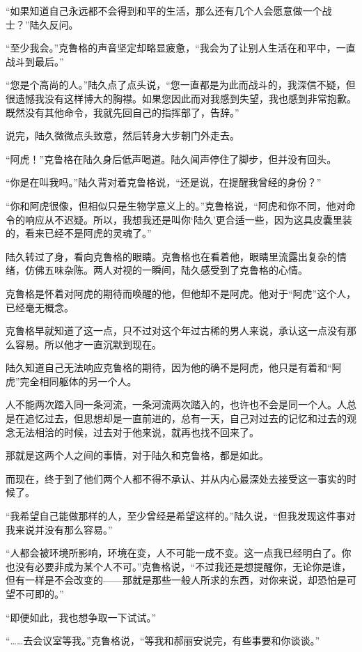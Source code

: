 “如果知道自己永远都不会得到和平的生活，那么还有几个人会愿意做一个战士？”陆久反问。

“至少我会。”克鲁格的声音坚定却略显疲惫，“我会为了让别人生活在和平中，一直战斗到最后。”

“您是个高尚的人。”陆久点了点头说，“您一直都是为此而战斗的，我深信不疑，但很遗憾我没有这样博大的胸襟。如果您因此而对我感到失望，我也感到非常抱歉。既然没有其他命令，我就先回自己的指挥部了，告辞。”

说完，陆久微微点头致意，然后转身大步朝门外走去。

“阿虎！”克鲁格在陆久身后低声喝道。陆久闻声停住了脚步，但并没有回头。

“你是在叫我吗。”陆久背对着克鲁格说，“还是说，在提醒我曾经的身份？”

“你和阿虎很像，但相似只是生物学意义上的。”克鲁格说，“阿虎和你不同，他对命令的响应从不迟疑。所以，我想我还是叫你‘陆久’更合适一些，因为这具皮囊里装的，看来已经不是阿虎的灵魂了。”

陆久转过了身，看向克鲁格的眼睛。克鲁格也在看着他，眼睛里流露出复杂的情绪，仿佛五味杂陈。两人对视的一瞬间，陆久感受到了克鲁格的心情。

克鲁格是怀着对阿虎的期待而唤醒的他，但他却不是阿虎。他对于“阿虎”这个人，已经毫无概念。

克鲁格早就知道了这一点，只不过对这个年过古稀的男人来说，承认这一点没有那么容易。所以他才一直沉默到现在。

陆久知道自己无法响应克鲁格的期待，因为他的确不是阿虎，他只是有着和“阿虎”完全相同躯体的另一个人。

人不能两次踏入同一条河流，一条河流两次踏入的，也许也不会是同一个人。人总是在追忆过去，但思想却是一直前进的，总有一天，自己对过去的记忆和过去的观念无法相洽的时候，过去对于他来说，就再也找不回来了。

那就是这两个人之间的事情，对于陆久和克鲁格，都是如此。

而现在，终于到了他们两个人都不得不承认、并从内心最深处去接受这一事实的时候了。

“我希望自己能做那样的人，至少曾经是希望这样的。”陆久说，“但我发现这件事对我来说并没有那么容易。”

“人都会被环境所影响，环境在变，人不可能一成不变。这一点我已经明白了。你也没有必要非成为某个人不可。”克鲁格说，“不过我还是想提醒你，无论你是谁，但有一样是不会改变的——那就是那些一般人所求的东西，对你来说，却恐怕是可望不可即的。”

“即便如此，我也想争取一下试试。”

“……去会议室等我。”克鲁格说，“等我和郝丽安说完，有些事要和你谈谈。”

